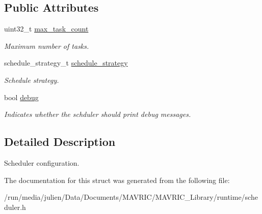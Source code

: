 \subsection*{Public Attributes}
\begin{DoxyCompactItemize}
\item 
\hypertarget{structscheduler__conf__t_aa2d0f0c0eb76293a3b5445503c2db5da}{uint32\+\_\+t \hyperlink{structscheduler__conf__t_aa2d0f0c0eb76293a3b5445503c2db5da}{max\+\_\+task\+\_\+count}}\label{structscheduler__conf__t_aa2d0f0c0eb76293a3b5445503c2db5da}

\begin{DoxyCompactList}\small\item\em Maximum number of tasks. \end{DoxyCompactList}\item 
\hypertarget{structscheduler__conf__t_ac8f82c5e776d2256975e3adf4832d514}{schedule\+\_\+strategy\+\_\+t \hyperlink{structscheduler__conf__t_ac8f82c5e776d2256975e3adf4832d514}{schedule\+\_\+strategy}}\label{structscheduler__conf__t_ac8f82c5e776d2256975e3adf4832d514}

\begin{DoxyCompactList}\small\item\em Schedule strategy. \end{DoxyCompactList}\item 
\hypertarget{structscheduler__conf__t_ac1afd730a3516ccc56284cadd82b8e15}{bool \hyperlink{structscheduler__conf__t_ac1afd730a3516ccc56284cadd82b8e15}{debug}}\label{structscheduler__conf__t_ac1afd730a3516ccc56284cadd82b8e15}

\begin{DoxyCompactList}\small\item\em Indicates whether the schduler should print debug messages. \end{DoxyCompactList}\end{DoxyCompactItemize}


\subsection{Detailed Description}
Scheduler configuration. 

The documentation for this struct was generated from the following file\+:\begin{DoxyCompactItemize}
\item 
/run/media/julien/\+Data/\+Documents/\+M\+A\+V\+R\+I\+C/\+M\+A\+V\+R\+I\+C\+\_\+\+Library/runtime/scheduler.\+h\end{DoxyCompactItemize}
